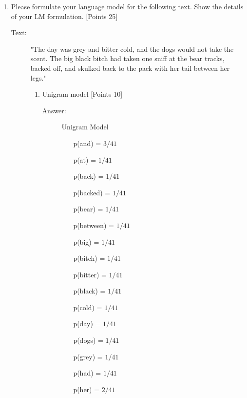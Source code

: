 \documentclass[12pt]{article}
\begin{document}
\begin{enumerate}
    \item Please formulate your language model for the following text. Show the
          details of your LM formulation. [Points 25]
          \begin{description}
              \item[Text:] "The day was grey and bitter cold, and the dogs would
                  not take the scent. The big black bitch had taken one sniff at
                  the bear tracks, backed off, and skulked back to the pack with
                  her tail between her legs."
                  \begin{enumerate}
                      \item Unigram model [Points 10]
                            \begin{description}
                                \item[Answer:] Unigram Model
                                    \begin{enumerate}
                                        \item[p(and) =] $3/41$
                                        \item[p(at) =] $1/41$
                                        \item[p(back) =] $1/41$
                                        \item[p(backed) =] $1/41$
                                        \item[p(bear) =] $1/41$
                                        \item[p(between) =] $1/41$
                                        \item[p(big) =] $1/41$
                                        \item[p(bitch) =] $1/41$
                                        \item[p(bitter) =] $1/41$
                                        \item[p(black) =] $1/41$
                                        \item[p(cold) =] $1/41$
                                        \item[p(day) =] $1/41$
                                        \item[p(dogs) =] $1/41$
                                        \item[p(grey) =] $1/41$
                                        \item[p(had) =] $1/41$
                                        \item[p(her) =] $2/41$

\end{enumerate}
\end{description}
\end{enumerate}
\end{description}
\end{enumerate}
\end{document}
